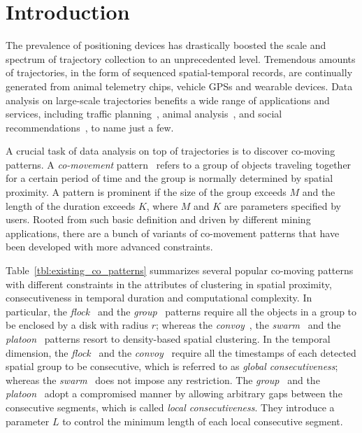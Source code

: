 \section{Introduction}
The prevalence of positioning devices has drastically boosted 
the scale and spectrum of trajectory collection to an unprecedented level. 
Tremendous amounts of trajectories, in the form of sequenced spatial-temporal 
records, are continually generated from animal telemetry chips, 
vehicle GPSs and wearable devices. Data analysis on large-scale 
trajectories benefits a wide range of applications and services, 
including traffic planning~\cite{zheng2011urban}, animal analysis~\cite{li2010miningperiodic}, and social recommendations~\cite{bao2013survey}, to name just a few.


A crucial task of data analysis on top of trajectories is 
to discover co-moving patterns. A \emph{co-movement} pattern~\cite{li2013managing} 
refers to a group of objects traveling together for a certain period of time 
and the group is normally determined by spatial proximity. 
A pattern is prominent if the size of the group exceeds $M$ and the length of the duration exceeds $K$, where $M$ and $K$ are parameters specified by users. Rooted from such basic definition 
and driven by different mining applications, there are a bunch of variants 
of co-movement patterns that have been developed with more advanced constraints.

Table~\ref{tbl:existing_co_patterns} summarizes several popular co-moving patterns 
with different constraints in the attributes of clustering in spatial proximity,
consecutiveness in temporal duration and computational complexity. 
In particular,  the \emph{flock}~\cite{gudmundsson2006flock} 
and the \emph{group}~\cite{wang2006grouppattern} patterns require 
all the objects in a group to be enclosed by a disk with radius $r$; 
whereas the \emph{convoy}~\cite{jeung2008convoy}, the \emph{swarm}~\cite{li2010swarm} 
and the \emph{platoon}~\cite{li2015platoon} patterns resort to density-based 
spatial clustering. 
In the temporal dimension, the \emph{flock}~\cite{gudmundsson2006flock} 
and the \emph{convoy}~\cite{jeung2008convoy} require all the timestamps 
of each detected spatial group to be consecutive, which is referred to as \emph{global consecutiveness}; 
whereas the \emph{swarm}~\cite{li2010swarm} does not impose any restriction. 
The \emph{group}~\cite{wang2006grouppattern} and the \emph{platoon}~\cite{li2015platoon} adopt a compromised manner by allowing
arbitrary gaps between the consecutive segments, which is called \emph{local consecutiveness}. 
They introduce a parameter $L$ to control the minimum length of each local consecutive segment.


